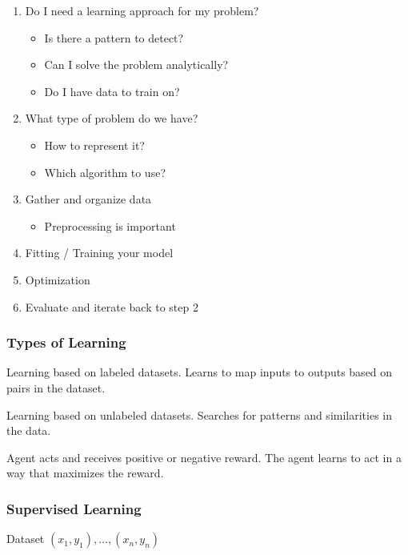 \documentclass[
../EiKI_Summary.tex,
]
{subfiles}
\begin{document}
\begin{enumerate}
    \item Do I need a learning approach for my problem?
    \begin{itemize}
        \item Is there a pattern to detect?
        \item Can I solve the problem analytically?
        \item Do I have data to train on?
    \end{itemize}
    \item What type of problem do we have?
    \begin{itemize}
        \item How to represent it?
        \item Which algorithm to use?
    \end{itemize}
    \item Gather and organize data
    \begin{itemize}
        \item Preprocessing is important
    \end{itemize}
    \item Fitting / Training your model
    \item Optimization
    \item Evaluate and iterate back to step 2
\end{enumerate}

\subsubsection{Types of Learning}
\begin{defbox}
    Learning based on labeled datasets. Learns to map inputs to outputs based on pairs in the dataset.
\end{defbox}

\begin{defbox}
    Learning based on unlabeled datasets. Searches for patterns and similarities in the data.
\end{defbox}

\begin{defbox}
    Agent acts and receives positive or negative reward. The agent learns to act in a way that maximizes the reward.
\end{defbox}

\newpage
\subsubsection{Supervised Learning}
 Dataset $(x_1,y_1), \ldots, (x_n,y_n)$
\end{document}
